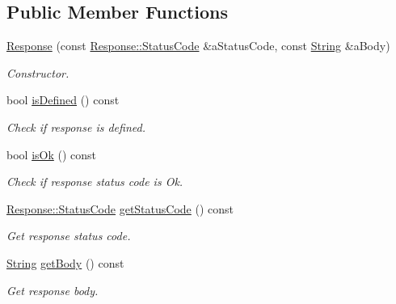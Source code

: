 \subsection*{Public Member Functions}
\begin{DoxyCompactItemize}
\item 
\hyperlink{classostk_1_1io_1_1ip_1_1tcp_1_1http_1_1_response_a859b29979cfa8dbd7d8296e1211b76fc}{Response} (const \hyperlink{classostk_1_1io_1_1ip_1_1tcp_1_1http_1_1_response_af537657bbf13ea832203957144230c36}{Response\+::\+Status\+Code} \&a\+Status\+Code, const \hyperlink{namespaceostk_1_1io_1_1ip_1_1tcp_1_1http_a88a1b82fb01d02df64ca01ef4058bbef}{String} \&a\+Body)
\begin{DoxyCompactList}\small\item\em Constructor. \end{DoxyCompactList}\item 
bool \hyperlink{classostk_1_1io_1_1ip_1_1tcp_1_1http_1_1_response_afc78e507b0c295a20d9ef90748deb32b}{is\+Defined} () const
\begin{DoxyCompactList}\small\item\em Check if response is defined. \end{DoxyCompactList}\item 
bool \hyperlink{classostk_1_1io_1_1ip_1_1tcp_1_1http_1_1_response_a44768f02be45b9363a00a12c33aa112d}{is\+Ok} () const
\begin{DoxyCompactList}\small\item\em Check if response status code is Ok. \end{DoxyCompactList}\item 
\hyperlink{classostk_1_1io_1_1ip_1_1tcp_1_1http_1_1_response_af537657bbf13ea832203957144230c36}{Response\+::\+Status\+Code} \hyperlink{classostk_1_1io_1_1ip_1_1tcp_1_1http_1_1_response_a180c8df8a6a7c0b97acd1e5d3a01e981}{get\+Status\+Code} () const
\begin{DoxyCompactList}\small\item\em Get response status code. \end{DoxyCompactList}\item 
\hyperlink{namespaceostk_1_1io_1_1ip_1_1tcp_1_1http_a88a1b82fb01d02df64ca01ef4058bbef}{String} \hyperlink{classostk_1_1io_1_1ip_1_1tcp_1_1http_1_1_response_a86ef445eae9c71c35a00b24f31345a8c}{get\+Body} () const
\begin{DoxyCompactList}\small\item\em Get response body. \end{DoxyCompactList}\end{DoxyCompactItemize}
